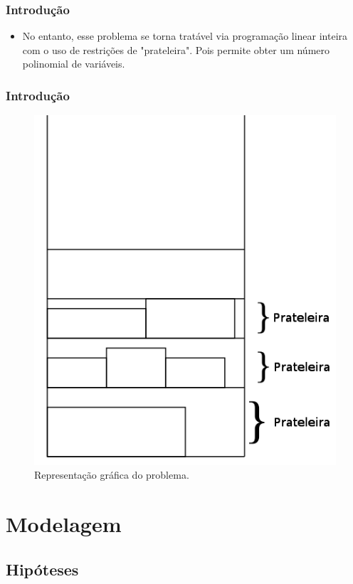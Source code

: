 \documentclass{beamer}
\begin{document}
\begin{frame}
\frametitle {Introdução}

    \begin{itemize}
    \item No entanto, esse problema se torna tratável via programação linear inteira com o uso de restrições de "prateleira". Pois permite obter um número polinomial de variáveis. 
    \end{itemize}
\end{frame}

\begin{frame}
    \frametitle{Introdução}
    \begin{figure}
    \includegraphics[scale=0.3]{sheft.png}
    \caption{Representação gráfica do problema.}
    \end{figure}
\end{frame}

\section{Modelagem}

\subsection{Hipóteses}
\end{document}
